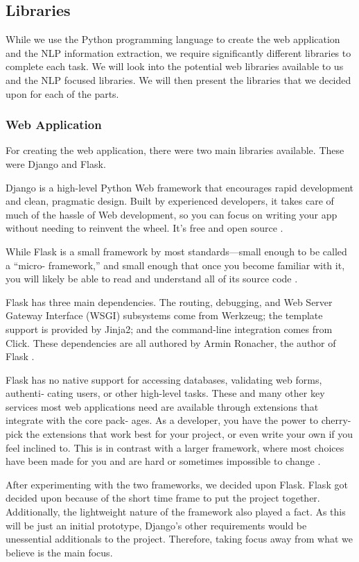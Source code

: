 	\subsection{Libraries}
	While we use the Python programming language to create the web application and the NLP information extraction, we require significantly different libraries to complete each task. We will look into the potential web libraries available to us and the NLP focused libraries. We will then present the libraries that we decided upon for each of the parts.
	
	\subsubsection{Web Application}
	For creating the web application, there were two main libraries available. These were Django and Flask.
	
	Django is a high-level Python Web framework that encourages rapid development and clean, pragmatic design. Built by experienced developers, it takes care of much of the hassle of Web development, so you can focus on writing your app without needing to reinvent the wheel. It’s free and open source \cite{django}.
	
	While Flask is a small framework by most standards—small enough to be called a “micro- framework,” and small enough that once you become familiar with it, you will likely be able to read and understand all of its source code \cite{grinberg2018flask}. 
	
	Flask has three main dependencies. The routing, debugging, and Web Server Gateway Interface (WSGI) subsystems come from Werkzeug; the template support is provided by Jinja2; and the command-line integration comes from Click. These dependencies are all authored by Armin Ronacher, the author of Flask \cite{grinberg2018flask}. 
	
	Flask has no native support for accessing databases, validating web forms, authenti‐ cating users, or other high-level tasks. These and many other key services most web applications need are available through extensions that integrate with the core pack‐ ages. As a developer, you have the power to cherry-pick the extensions that work best for your project, or even write your own if you feel inclined to. This is in contrast with a larger framework, where most choices have been made for you and are hard or sometimes impossible to change \cite{grinberg2018flask}.
	
	After experimenting with the two frameworks, we decided upon Flask. Flask got decided upon because of the short time frame to put the project together. Additionally, the lightweight nature of the framework also played a fact. As this will be just an initial prototype, Django's other requirements would be unessential additionals to the project. Therefore, taking focus away from what we believe is the main focus. 
	
